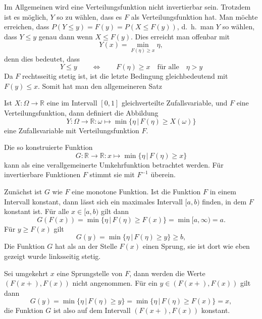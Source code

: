 Im Allgemeinen wird eine Verteilungsfunktion nicht invertierbar sein.
Trotzdem ist es möglich, $Y$ so zu wählen, dass es $F$ als
Verteilungsfunktion hat.
Man möchte erreichen, dass $P(Y\le y)=F(y)
=P(X\le F(y))$, d.~h.~man $Y$ so wählen, dass $Y\le y$ genau dann wenn
$X\le F(y)$.
Dies erreicht man offenbar mit
\begin{equation}
Y(x)=\min_{F(\eta)\ge x}\eta,
\end{equation}
denn dies bedeutet, dass
\begin{equation}
Y\le y\qquad\Leftrightarrow\qquad
F(\eta)\ge x\quad\text{für alle}\quad \eta>y
\end{equation}
Da $F$ rechtsseitig stetig ist, ist die letzte Bedingung gleichbedeutend
mit $F(y)\le x$.
Somit hat man den allgemeineren Satz
\begin{satz}
Ist $X:\Omega\to\mathbb{R}$ eine im Intervall $[0,1]$
gleichverteilte Zufallsvariable,
und $F$ eine Verteilungsfunktion, dann definiert die Abbildung
\begin{equation}
Y\colon\Omega\to\mathbb{R}\colon \omega\mapsto \min\{\eta\,|\,F(\eta)\ge X(\omega)\}
\end{equation}
eine Zufallsvariable mit Verteilungsfunktion $F$.
\end{satz}
Die so konstruierte Funktion
\begin{equation}
G\colon\mathbb{R}\to\mathbb{R}\colon x\mapsto\min\{\eta\,|\,F(\eta)\ge x\}
\end{equation}
kann als eine verallgemeinerte Umkehrfunktion betrachtet werden.
Für invertierbare Funktionen $F$ stimmt sie mit $F^{-1}$ überein.

Zunächst ist $G$ wie $F$ eine monotone Funktion.
Ist die Funktion $F$ in einem Intervall konstant, dann lässt sich ein maximales
Intervall $[a,b)$ finden, in dem $F$ konstant ist.
Für alle $x\in[a,b)$ gilt dann
\begin{equation}
G(F(x))=\min\{\eta\,|\,F(\eta)\ge F(x)\}=\min[a,\infty)=a.
\end{equation}
Für $y\ge F(x)$ gilt
\begin{equation}
G(y)=\min\{\eta\,|\,F(\eta)\ge y\}\ge b,
\end{equation}
Die Funktion $G$ hat als an der Stelle $F(x)$ einen Sprung, sie ist dort
wie eben gezeigt wurde linksseitig stetig.

Sei umgekehrt $x$ eine Sprungstelle von $F$, dann werden die
Werte $(F(x+),F(x))$ nicht angenommen.
Für ein $y\in(F(x+),F(x))$
gilt dann
\begin{equation}
G(y)=\min\{\eta\,|\,F(\eta)\ge y\}=\min\{\eta\,|\,F(\eta)\ge F(x)\}=x,
\end{equation}
die Funktion $G$ ist also auf dem Intervall $(F(x+),F(x))$ konstant.

